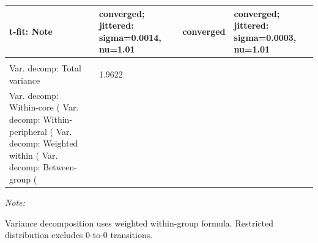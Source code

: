 \begin{table}[!h]
{\begin{threeparttable}
\begin{tabular}[t]{llll}
\midrule
\hspace{1em}t-fit: Note & converged; jittered: sigma=0.0014, nu=1.01 & converged & converged; jittered: sigma=0.0003, nu=1.01\\
\midrule
\addlinespace[0.3em]
\multicolumn{4}{l}{\textbf{Variance Decomposition}}\\
\hspace{1em}Var. decomp: Total variance & 1.9622 &  & \\
\midrule
\hspace{1em}Var. decomp: Within-core (%
\midrule
\hspace{1em}Var. decomp: Within-peripheral (%
\midrule
\hspace{1em}Var. decomp: Weighted within (%
\midrule
\hspace{1em}Var. decomp: Between-group (%
\bottomrule
\end{tabular}
\begin{tablenotes}[para]
\item \textit{Note: } 
\item Variance decomposition uses weighted within-group formula. Restricted distribution excludes 0-to-0 transitions.
\end{tablenotes}
\end{threeparttable}}
\end{table}

